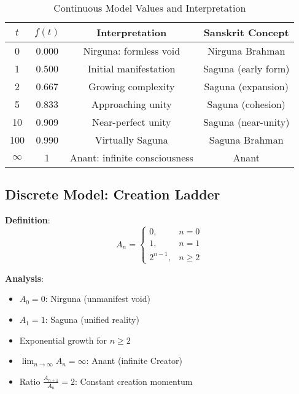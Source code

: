 \documentclass[11pt]{article}
\begin{document}
\begin{table}[h]
\centering
\caption{Continuous Model Values and Interpretation}
\begin{tabular}{c c c c}
\toprule
\( t \) & \( f(t) \) & Interpretation & Sanskrit Concept \\
\midrule
0 & 0.000 & Nirguna: formless void & Nirguna Brahman \\
1 & 0.500 & Initial manifestation & Saguna (early form) \\
2 & 0.667 & Growing complexity & Saguna (expansion) \\
5 & 0.833 & Approaching unity & Saguna (cohesion) \\
10 & 0.909 & Near-perfect unity & Saguna (near-unity) \\
100 & 0.990 & Virtually Saguna & Saguna Brahman \\
\(\infty\) & 1 & Anant: infinite consciousness & Anant \\
\bottomrule
\end{tabular}
\label{tab:continuous}
\end{table}

\subsection{Discrete Model: Creation Ladder}
\textbf{Definition}:
\[
A_n =
\begin{cases}
0, & n = 0 \\
1, & n = 1 \\
2^{n-1}, & n \geq 2
\end{cases}
\]

\textbf{Analysis}:
\begin{itemize}
    \item \(A_0 = 0\): Nirguna (unmanifest void)
    \item \(A_1 = 1\): Saguna (unified reality)
    \item Exponential growth for \(n \geq 2\)
    \item \(\lim_{n \to \infty} A_n = \infty\): Anant (infinite Creator)
    \item Ratio \(\frac{A_{n+1}}{A_n} = 2\): Constant creation momentum
\end{itemize}
\end{document}
